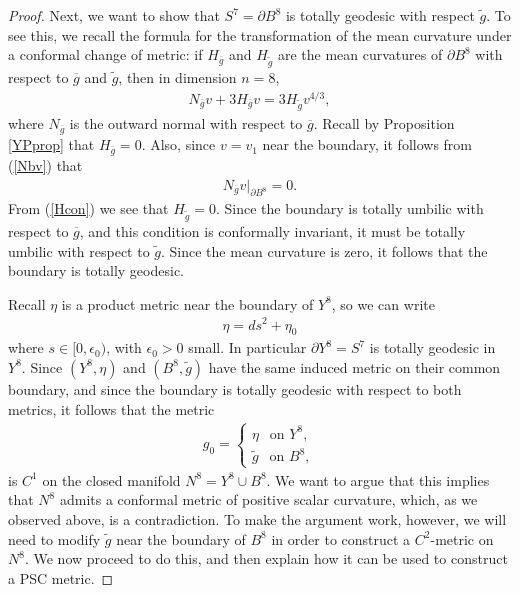 \documentclass{amsart}
\newcommand{\wtg}{\widetilde{g}}
\theoremstyle{definition}
\theoremstyle{remark}
\numberwithin{equation}{section}
\begin{document}
\begin{proof}
Next, we want to show that $S^7 = \partial B^8$ is totally geodesic with respect $\widetilde{g}$.  To see this, we recall the formula for the transformation of the mean curvature under a conformal change of metric: if $H_{\overline{g}}$ and $H_{\widetilde{g}}$ are the mean curvatures of $\partial B^8$ with respect to $\overline{g}$ and $\widetilde{g}$, then in dimension $n = 8$,
\begin{align} \label{Hcon}
N_{\overline{g}}v + 3 H_{\overline{g}} v = 3 H_{\widetilde{g}} v^{4/3},
\end{align}
where $N_{\overline{g}}$ is the outward normal with respect to $\overline{g}$.  Recall by Proposition \ref{YPprop} that $H_{\overline{g}} = 0$.  Also, since $v = v_1$ near the boundary,
it follows from (\ref{Nbv}) that
\begin{align*} %
N_{\overline{g}}v \big|_{\partial B^8} = 0.
\end{align*}
From (\ref{Hcon}) we see that $H_{\widetilde{g}} = 0$.  Since the boundary is totally
umbilic with respect to $\overline{g}$, and this condition is conformally invariant, it must be totally umbilic with
respect to $\widetilde{g}$.  Since the mean curvature is zero, it follows that the boundary is totally geodesic.



Recall $\eta$ is a product metric near the boundary of $Y^8$, so we can write
\begin{align} \label{split}
\eta = ds^2 + \eta_0
\end{align}
where $s \in [0,\epsilon_0)$, with $\epsilon_0 > 0$ small.   In particular $\partial Y^8 = S^7$ is totally geodesic in $Y^8$. Since $(Y^8,\eta)$ and $(B^8,\widetilde{g})$ have the same induced metric on their common boundary, and since the boundary is totally geodesic with respect to both metrics,
it follows that the metric
\begin{align} \label{g0}
g_0 = \begin{cases} \eta \ \ \mbox{ on } Y^8, \\
\widetilde{g} \ \ \mbox{ on }B^8,
\end{cases}
\end{align}
is $C^1$ on the closed manifold $N^8 = Y^8 \cup B^8$.  We want to argue that this implies that $N^8$ admits a conformal metric of positive scalar curvature, which, as we observed above, is a contradiction.  To make the argument work, however, we will need to modify $\wtg$ near the boundary of $B^8$ in order to construct a $C^2$-metric on $N^8$.  We now proceed to do this, and then explain how it can be used to construct a PSC metric.


\end{proof}
\end{document}
